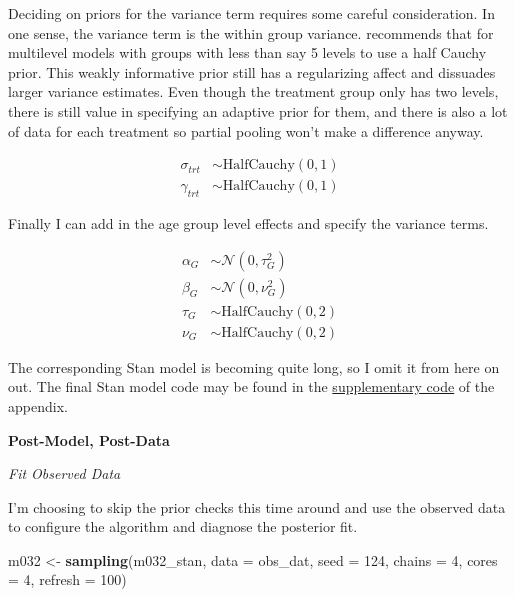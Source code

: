 \documentclass[11pt, oneside, openany]{scrbook}
\newenvironment{Shaded}{\begin{snugshade}}{\end{snugshade}}
\newcommand{\DataTypeTok}[1]{\textcolor[rgb]{0.13,0.29,0.53}{#1}}
\newcommand{\DecValTok}[1]{\textcolor[rgb]{0.00,0.00,0.81}{#1}}
\newcommand{\KeywordTok}[1]{\textcolor[rgb]{0.13,0.29,0.53}{\textbf{#1}}}
\newcommand{\NormalTok}[1]{#1}
\newcommand{\StringTok}[1]{\textcolor[rgb]{0.31,0.60,0.02}{#1}}
\begin{document}
Deciding on priors for the variance term requires some careful consideration. In one sense, the variance term is the within group variance. \citet{gelman2006prior} recommends that for multilevel models with groups with less than say 5 levels to use a half Cauchy prior. This weakly informative prior still has a regularizing affect and dissuades larger variance estimates. Even though the treatment group only has two levels, there is still value in specifying an adaptive prior for them, and there is also a lot of data for each treatment so partial pooling won't make a difference anyway.


\begin{align*}
\sigma_{trt} &\sim \mathrm{HalfCauchy}(0, 1) \\
\gamma_{trt} &\sim \mathrm{HalfCauchy}(0, 1)
\end{align*}

Finally I can add in the age group level effects and specify the variance terms.


\begin{align*}
\alpha_{G} &\sim \mathcal{N}(0, \tau_{G}^2)\\
\beta_{G} &\sim \mathcal{N}(0, \nu_{G}^2) \\
\tau_{G} &\sim \mathrm{HalfCauchy}(0, 2) \\
\nu_{G} &\sim \mathrm{HalfCauchy}(0, 2)
\end{align*}

The corresponding Stan model is becoming quite long, so I omit it from here on out. The final Stan model code may be found in the \protect\hyperlink{supplementary-code}{supplementary code} of the appendix.

\textbf{Post-Model, Post-Data}

\emph{Fit Observed Data}

I'm choosing to skip the prior checks this time around and use the observed data to configure the algorithm and diagnose the posterior fit.


\begin{Shaded}
\begin{Highlighting}[]
\NormalTok{m032 <-}\StringTok{ }\KeywordTok{sampling}\NormalTok{(m032_stan, }\DataTypeTok{data =}\NormalTok{ obs_dat, }\DataTypeTok{seed =} \DecValTok{124}\NormalTok{,}
                 \DataTypeTok{chains =} \DecValTok{4}\NormalTok{, }\DataTypeTok{cores =} \DecValTok{4}\NormalTok{, }\DataTypeTok{refresh =} \DecValTok{100}\NormalTok{)}
\end{Highlighting}
\end{Shaded}
\end{document}
